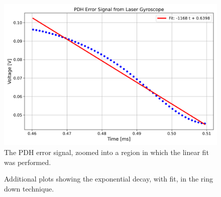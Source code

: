 \documentclass[a4paper]{report}
\numberwithin{equation}{section}
\begin{document}
\begin{figure}[h!]
	\centering
	\includegraphics[width=0.8\columnwidth]{pdh_err_filt_fit_zoomed.png}
	\caption{The PDH error signal, zoomed into a region in which the linear fit was performed.}
	\label{fig:pdh_err_fit_zoomed}
\end{figure}


\begin{figure}[h!]
	\centering
	\quad
	\centering
	\quad
	\centering
	\quad
	\centering
	\caption{Additional plots showing the exponential decay, with fit, in the ring down technique.}
\end{figure}
\end{document}
